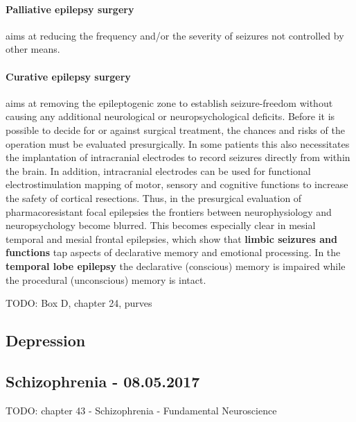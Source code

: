 \documentclass[12pt,article,oneside,a4paper]{memoir}
\begin{document}
\paragraph{Palliative epilepsy surgery} aims at reducing the frequency and/or the severity of seizures not controlled by other means.

\paragraph{Curative epilepsy surgery} aims at removing the epileptogenic zone to establish seizure-freedom without causing any additional neurological or neuropsychological deficits.
Before it is possible to decide for or against surgical treatment, the chances and risks of the operation must be evaluated presurgically. In some patients this also necessitates the implantation of intracranial electrodes to record seizures directly from within the brain. In addition, intracranial electrodes can be used for functional electrostimulation mapping of motor, sensory and cognitive functions to increase the safety of cortical resections.
Thus, in the presurgical evaluation of pharmacoresistant focal epilepsies the frontiers between neurophysiology and neuropsychology become blurred. This becomes especially clear in mesial temporal and mesial frontal epilepsies, which show that \textbf{limbic seizures and functions} tap aspects of declarative memory and emotional processing.
In the \textbf{temporal lobe epilepsy} the declarative (conscious) memory is impaired while the procedural (unconscious) memory is intact.




TODO: Box D, chapter 24, purves

\newpage
\subsection{Depression}

\newpage
\subsection{Schizophrenia - 08.05.2017}

TODO: chapter 43 - Schizophrenia - Fundamental Neuroscience
\newpage
\end{document}
